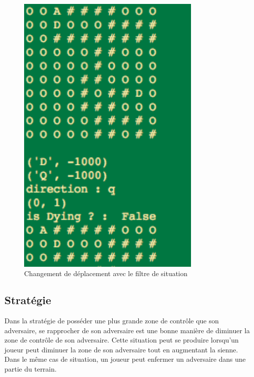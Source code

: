 \begin{figure}[H]
	\centering
	\includegraphics[width=0.8\textwidth, keepaspectratio, height=0.3\textheight]{./pics/anti_suicide.png}	
	\caption{Changement de déplacement avec le filtre de situation}
\end{figure}



\subsection{Stratégie}
Dans la stratégie de posséder une plus grande zone de    contrôle que son adversaire, se rapprocher de son adversaire est une bonne    manière de diminuer la zone de contrôle de son adversaire. Cette situation    peut se produire lorsqu'un joueur peut diminuer la zone de son adversaire    tout en augmentant la sienne. Dans le même cas de situation, un joueur peut    enfermer un adversaire dans une partie du terrain.


